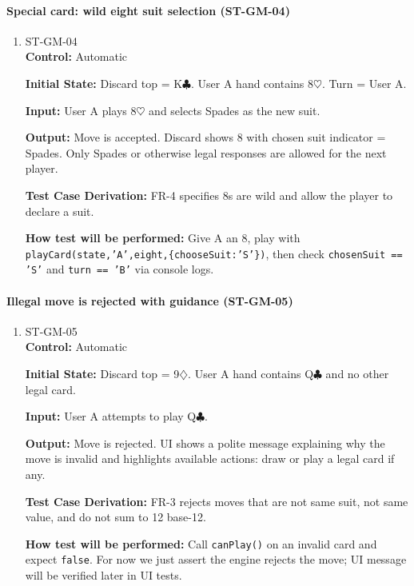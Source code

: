 \documentclass[12pt, titlepage]{article}
\begin{document}
\paragraph{Special card: wild eight suit selection (ST-GM-04)}
\begin{enumerate}
\item{ST-GM-04\\}
\textbf{Control:} Automatic

\textbf{Initial State:} Discard top = K$\clubsuit$. User A hand contains 8$\heartsuit$. Turn = User A.

\textbf{Input:} User A plays 8$\heartsuit$ and selects Spades as the new suit.

\textbf{Output:} Move is accepted. Discard shows 8 with chosen suit indicator = Spades. Only Spades or otherwise legal responses are allowed for the next player.

\textbf{Test Case Derivation:} FR-4 specifies 8s are wild and allow the player to declare a suit.

\textbf{How test will be performed:} Give A an 8, play with \texttt{playCard(state,'A',eight,\{chooseSuit:'S'\})}, then check \texttt{chosenSuit == 'S'} and \texttt{turn == 'B'} via console logs.
\end{enumerate}

\paragraph{Illegal move is rejected with guidance (ST-GM-05)}
\begin{enumerate}
\item{ST-GM-05\\}
\textbf{Control:} Automatic

\textbf{Initial State:} Discard top = 9$\diamondsuit$. User A hand contains Q$\clubsuit$ and no other legal card.

\textbf{Input:} User A attempts to play Q$\clubsuit$.

\textbf{Output:} Move is rejected. UI shows a polite message explaining why the move is invalid and highlights available actions: draw or play a legal card if any.

\textbf{Test Case Derivation:} FR-3 rejects moves that are not same suit, not same value, and do not sum to 12 base-12.

\textbf{How test will be performed:} Call \texttt{canPlay()} on an invalid card and expect \texttt{false}. For now we just assert the engine rejects the move; UI message will be verified later in UI tests.
\end{enumerate}
\end{document}
